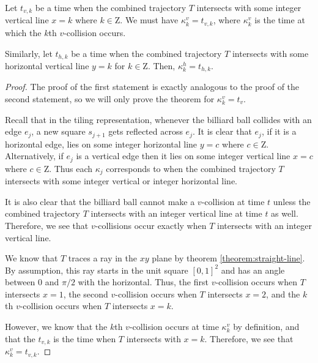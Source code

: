 \begin{theorem}
  Let $t_{v, k}$ be a time when the combined trajectory $T$ intersects with some integer vertical line $x = k$ where $k \in \mathrm{Z}$. We must have $\kappa^v_k = t_{v, k}$, where $\kappa^v_k$ is the time at which the $k$th $v$-collision occurs.

  Similarly, let $t_{h, k}$ be a time when the combined trajectory $T$ intersects with some horizontal vertical line $y = k$ for $k \in \mathrm{Z}$. Then, $\kappa^h_k = t_{h, k}$.
\end{theorem}
\begin{proof}
  The proof of the first statement is exactly analogous to the proof of the second statement, so we will only prove the theorem for $\kappa^v_k = t_v$.

  Recall that in the tiling representation, whenever the billiard ball collides with an edge $e_j$, a new square $s_{j+1}$ gets reflected across $e_j$. It is clear that $e_j$, if it is a horizontal edge, lies on some integer horizontal line $y = c$ where $c \in \mathrm{Z}$. Alternatively, if $e_j$ is a vertical edge then it lies on some integer vertical line $x = c$ where $c \in \mathrm{Z}$. Thus each $\kappa_j$ corresponds to when the combined trajectory $T$ intersects with some integer vertical or integer horizontal line.

  It is also clear that the billiard ball cannot make a $v$-collision at time $t$ unless the combined trajectory $T$ intersects with an integer vertical line at time $t$ as well. Therefore, we see that $v$-collisions occur exactly when $T$ intersects with an integer vertical line.

  We know that $T$ traces a ray in the $xy$ plane by theorem \ref{theorem:straight-line}. By assumption, this ray starts in the unit square $[0,1]^2$ and has an angle between $0$ and $\pi/2$ with the horizontal. Thus, the first $v$-collision occurs when $T$ intersects $x = 1$, the second $v$-collision occurs when $T$ intersects $x = 2$, and the $k$th $v$-collision occurs when $T$ intersects $x = k$.

  However, we know that the $k$th $v$-collision occurs at time $\kappa^v_{k}$ by definition, and that the $t_{v, k}$ is the time when $T$ intersects with $x = k$. Therefore, we see that $\kappa^v_{k} = t_{v, k}$.
\end{proof}
